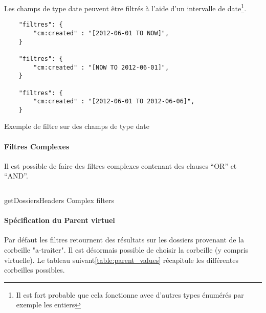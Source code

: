 Les champs de type date peuvent être filtrés à l'aide d'un intervalle de date\footnote{Il est fort probable que cela fonctionne avec d'autres types énumérés par exemple les entiers}.

\begin{codesnippet}
\begin{verbatim}
	"filtres": {
		"cm:created" : "[2012-06-01 TO NOW]",
	}
	
	"filtres": {
		"cm:created" : "[NOW TO 2012-06-01]",
	}
	
	"filtres": {
		"cm:created" : "[2012-06-01 TO 2012-06-06]",
	}
\end{verbatim}
\caption{Exemple de filtre sur des champs de type date}
\end{codesnippet}

\paragraph{Filtres Complexes}
Il est possible de faire des filtres complexes contenant des clauses ``OR'' et ``AND''.

\begin{codesnippet}
\inputminted[frame=single,linenos,fontsize=\footnotesize]{javascript}{extraits/getDossiersHeaders_search_complex_in.js}
\caption{getDossiersHeaders Complex filters}
\label{snip:getTypologie_in}
\end{codesnippet}

\paragraph{Spécification du Parent virtuel}

Par défaut les filtres retournent des résultats sur les dossiers provenant de la corbeille "a-traiter". Il est désormais possible de
choisir la corbeille (y compris virtuelle). Le tableau suivant\ref{table:parent_values} récapitule les différentes corbeilles possibles.

